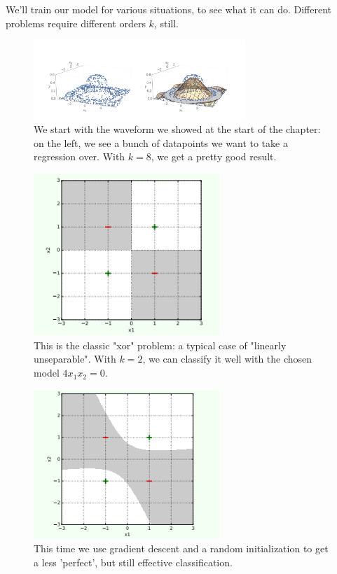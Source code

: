             We'll train our model for various situations, to see what it can do. Different problems require different orders $k$, still.
            
            \begin{figure}[H]
                \centering
                
                \includegraphics[width=80mm,scale=0.5]{images/feature_images/vibrations.png}
                \caption*{We start with the waveform we showed at the start of the chapter: on the left, we see a bunch of datapoints we want to take a regression over. With $k=8$, we get a pretty good result.}
            \end{figure}

            \begin{figure}[H]
                \centering
                
                \includegraphics[width=70mm,scale=0.5]{images/feature_images/xor.png}
                \caption*{This is the classic "xor" problem: a typical case of "linearly unseparable". With $k=2$, we can classify it well with the chosen model $4x_1x_2=0$.}
            \end{figure}

            \begin{figure}[H]
                \centering
                
                \includegraphics[width=70mm,scale=0.5]{images/feature_images/better_xor.png}
                \caption*{This time we use gradient descent and a random initialization to get a less 'perfect', but still effective classification. }
            \end{figure}

